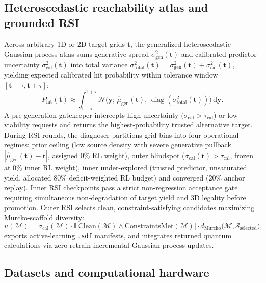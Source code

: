 \documentclass[11pt,a4paper]{article}
\begin{document}
\subsection*{Heteroscedastic reachability atlas and grounded RSI}

Across arbitrary 1D or 2D target grids $\mathbf{t}$, the generalized heteroscedastic Gaussian process atlas sums generative spread $\sigma_{\text{gen}}^2(\mathbf{t})$ and calibrated predictor uncertainty $\sigma_{\text{cal}}^2(\mathbf{t})$ into total variance $\sigma_{\text{total}}^2(\mathbf{t}) = \sigma_{\text{gen}}^2(\mathbf{t}) + \sigma_{\text{cal}}^2(\mathbf{t})$, yielding expected calibrated hit probability within tolerance window $[\mathbf{t}-\tau,\mathbf{t}+\tau]$:
\begin{equation}
P_{\text{hit}}(\mathbf{t}) \approx \int_{\mathbf{t}-\tau}^{\mathbf{t}+\tau} \mathcal{N}\!\big(\mathbf{y};\, \hat{\mu}_{\text{gen}}(\mathbf{t}),\, \operatorname{diag}(\sigma_{\text{total}}^2(\mathbf{t}))\big)\,\mathrm{d}\mathbf{y}.
\end{equation}
A pre-generation gatekeeper intercepts high-uncertainty ($\sigma_{\text{cal}} > \tau_{\text{cal}}$) or low-viability requests and returns the highest-probability trusted alternative target. During RSI rounds, the diagnoser partitions grid bins into four operational regimes: prior ceiling (low source density with severe generative pullback $|\hat{\mu}_{\text{gen}}(\mathbf{t})-\mathbf{t}|$, assigned $0\%$ RL weight), outer blindspot ($\sigma_{\text{cal}}(\mathbf{t}) > \tau_{\text{cal}}$, frozen at $0\%$ inner RL weight), inner under-explored (trusted predictor, unsaturated yield, allocated $80\%$ deficit-weighted RL budget) and converged ($20\%$ anchor replay). Inner RSI checkpoints pass a strict non-regression acceptance gate requiring simultaneous non-degradation of target yield and 3D legality before promotion. Outer RSI selects clean, constraint-satisfying candidates maximizing Murcko-scaffold diversity\cite{bemis1996murcko}:
\begin{equation}
u(\mathcal{M}) = \sigma_{\text{cal}}(\mathcal{M}) \cdot \mathbb{I}\!\big[\text{Clean}(\mathcal{M}) \land \text{ConstraintsMet}(\mathcal{M})\big] \cdot d_{\text{Murcko}}\!\big(\mathcal{M}, \mathcal{S}_{\text{selected}}\big),
\end{equation}
exports active-learning \texttt{.sdf} manifests, and integrates returned quantum calculations via zero-retrain incremental Gaussian process updates.

\subsection*{Datasets and computational hardware}
\end{document}
